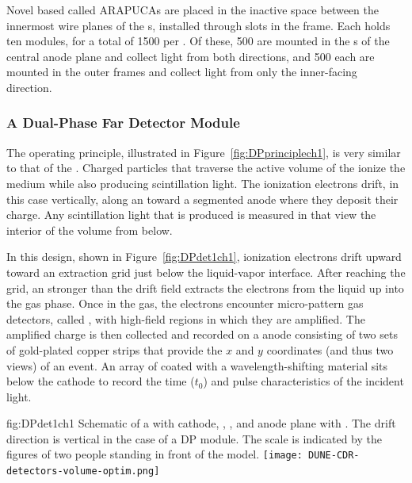 Novel  based  called ARAPUCAs are placed in the inactive space between the innermost wire planes of the s, installed through slots in the  frame. 
Each  holds ten  modules, for a total of \num{1500} per .  Of these, \num{500} are mounted in the s of the central anode plane and collect light from both directions, 
and \num{500} each are mounted in the outer  frames and collect light from only the inner-facing direction. 

\FloatBarrier
\subsubsection{A Dual-Phase Far Detector Module}
\label{sec:fddp-exec-splar}

The  operating principle, illustrated in Figure~\ref{fig:DPprinciplech1}, is very similar to that of the . %
 Charged particles that traverse the active volume of the  ionize the medium while also producing scintillation light.  The ionization electrons drift, in this case vertically, along an \efield toward a segmented anode where they deposit their charge. Any scintillation light that is produced is measured in   that view the interior of the volume from below. 
 
 In this design, shown in Figure~\ref{fig:DPdet1ch1}, ionization electrons drift upward toward an extraction grid just below the liquid-vapor interface. 
After reaching the grid, an \efield stronger than the \dpnominaldriftfield{} drift field extracts the electrons from the liquid up into the gas phase. Once in the gas, the electrons encounter micro-pattern gas detectors, called , with high-field regions
in which they are amplified. 
The amplified charge is then collected and recorded on a \twod anode
consisting of two sets of %
gold-plated copper strips that provide the $x$ and $y$ coordinates (and thus two views) of an event. 
An array of  coated with a wavelength-shifting material sits below the cathode to record the time ($t_{0}$) and pulse characteristics of the incident light.


\begin{dunefigure}{fig:DPdet1ch1}
  {Schematic of a \nominalmodsize {}    with cathode, , , and anode plane with . The drift direction is vertical in the case of a DP module. The scale is indicated by the figures of two people standing in front of the model.}
  \texttt{[image: DUNE-CDR-detectors-volume-optim.png]}
\end{dunefigure}

